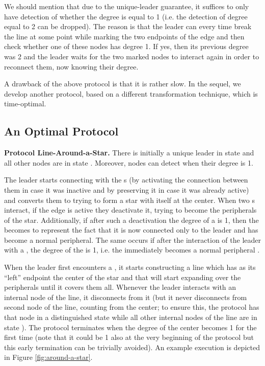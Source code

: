 \documentclass[preprint]{elsarticle}
\begin{document}
We should mention that due to the unique-leader guarantee, it suffices to only have detection of whether the degree is equal to 1 (i.e. the detection of degree equal to 2 can be dropped). The reason is that the leader can every time break the line at some point while marking the two endpoints of the edge and then check whether one of these nodes has degree 1. If yes, then its previous degree was 2 and the leader waits for the two marked nodes to interact again in order to reconnect them, now knowing their degree.

A drawback of the above protocol is that it is rather slow. In the sequel, we develop another protocol, based on a different transformation technique, which is time-optimal. 

\subsection{An Optimal Protocol}
\label{subsec:line-around-a-star}

\noindent\textbf{Protocol Line-Around-a-Star.} There is initially a unique leader in state  and all other nodes are in state . Moreover, nodes can detect when their degree is 1.

The leader starts connecting with the s (by activating the connection between them in case it was inactive and by preserving it in case it was already active) and converts them to  trying to form a star with itself at the center. When two s interact, if the edge is active they deactivate it, trying to become the peripherals of the star. Additionally, if after such a deactivation the degree of a  is 1, then the  becomes  to represent the fact that it is now connected only to the leader and has become a normal peripheral. The same occurs if after the interaction of the leader with a , the degree of the  is 1, i.e. the  immediately becomes a normal peripheral .

When the leader first encounters a , it starts constructing a line which has as its ``left'' endpoint the center of the star and that will start expanding over the peripherals until it covers them all. Whenever the leader interacts with an internal node of the line, it disconnects from it (but it never disconnects from second node of the line, counting from the center; to ensure this, the protocol has that node in a distinguished state  while all other internal nodes of the line are in state ). The protocol terminates when the degree of the center becomes 1 for the first time (note that it could be 1 also at the very beginning of the protocol but this early termination can be trivially avoided). An example execution is depicted in Figure \ref{fig:around-a-star}.
\end{document}
